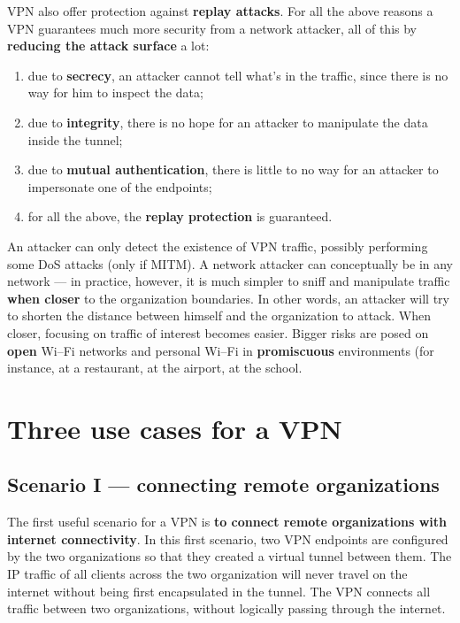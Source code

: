 \documentclass[10pt]{\classname}
\begin{document}
VPN also offer protection against \textbf{replay attacks}. For all the above
reasons a VPN guarantees much more security from a network attacker, all of
this by \textbf{reducing the attack surface} a lot:
\begin{enumerate}
    \item due to \textbf{secrecy}, an attacker cannot tell what's in the
        traffic, since there is no way for him to inspect the data;
    \item due to \textbf{integrity}, there is no hope for an attacker to
        manipulate the data inside the tunnel;
    \item due to \textbf{mutual authentication}, there is little to no way for
        an attacker to impersonate one of the endpoints;
    \item for all the above, the \textbf{replay protection} is guaranteed.
\end{enumerate}

An attacker can only detect the existence of VPN traffic, possibly performing
some DoS attacks (only if MITM). A network attacker can conceptually be in any
network --- in practice, however, it is much simpler to sniff and manipulate
traffic \textbf{when closer} to the organization boundaries. In other words, an
attacker will try to shorten the distance between himself and the organization
to attack. When closer, focusing on traffic of interest becomes easier. Bigger
risks are posed on \textbf{open} Wi--Fi networks and personal Wi--Fi in
\textbf{promiscuous} environments (for instance, at a restaurant, at the
airport, at the school.



\section{Three use cases for a VPN}
\subsection{Scenario I --- connecting remote organizations}

The first useful scenario for a VPN is \textbf{to connect remote organizations
with internet connectivity}. In this first scenario, two VPN endpoints are
configured by the two organizations so that they created a virtual tunnel
between them. The IP traffic of all clients across the two organization will
never travel on the internet without being first encapsulated in the tunnel.
The VPN connects all traffic between two organizations, without logically
passing through the internet.
\end{document}
